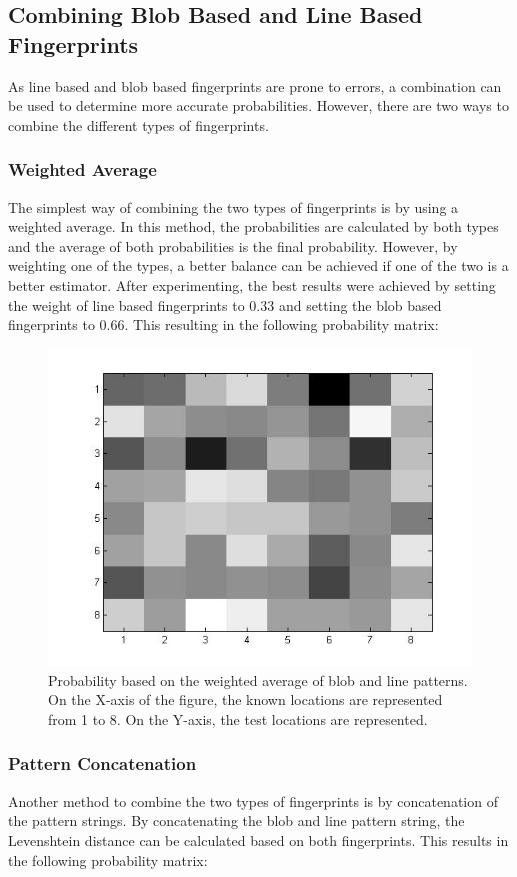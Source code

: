 \documentclass[12pt]{article}
\begin{document}
\subsection{Combining Blob Based and Line Based Fingerprints}
As line based and blob based fingerprints are prone to errors, a combination can be used to determine more accurate probabilities. However, there are two ways to combine the different types of fingerprints.
\subsubsection{Weighted Average}
The simplest way of combining the two types of fingerprints is by using a weighted average. In this method, the probabilities are calculated by both types and the average of both probabilities is the final probability. However, by weighting one of the types, a better balance can be achieved if one of the two is a better estimator. After experimenting, the best results were achieved by setting the weight of line based fingerprints to 0.33 and setting the blob based fingerprints to 0.66. This resulting in the following probability matrix:

\begin{figure}[H]
	\centering
	\includegraphics[width=\textwidth]{lines_and_blobs_chance_weighted.jpg}
	\caption{Probability based on the weighted average of blob and line patterns. On the X-axis of the figure, the known locations are represented from 1 to 8. On the Y-axis, the test locations are represented.}
\end{figure}

\subsubsection{Pattern Concatenation}
Another method to combine the two types of fingerprints is by concatenation of the pattern strings. By concatenating the blob and line pattern string, the Levenshtein distance can be calculated based on both fingerprints. This results in the following probability matrix:
\end{document}

